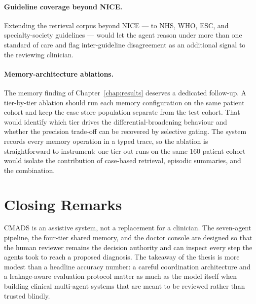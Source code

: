 \paragraph{Guideline coverage beyond NICE.}
Extending the retrieval corpus beyond NICE --- to NHS, WHO, ESC, and
specialty-society guidelines --- would let the agent reason under more
than one standard of care and flag inter-guideline disagreement as an
additional signal to the reviewing clinician.

\paragraph{Memory-architecture ablations.}
The memory finding of Chapter~\ref{chap:results} deserves a dedicated
follow-up. A tier-by-tier ablation should run each memory configuration on the
same patient cohort and keep the case store population separate from the test
cohort. That would identify which tier drives the differential-broadening
behaviour and whether the precision trade-off can be recovered by selective
gating. The system records every memory operation in a typed trace, so the
ablation is straightforward to instrument: one-tier-out runs on the same
160-patient cohort would isolate the contribution of case-based retrieval,
episodic summaries, and the combination.

\section{Closing Remarks}
\label{sec:concl_remarks}

CMADS is an assistive system, not a replacement for a clinician. The
seven-agent pipeline, the four-tier shared memory, and the doctor
console are designed so that the human reviewer remains the decision
authority and can inspect every step the agents took to reach a
proposed diagnosis. The takeaway of the thesis is more modest than a
headline accuracy number: a careful coordination architecture and a
leakage-aware evaluation protocol matter as much as the model itself
when building clinical multi-agent systems that are meant to be
reviewed rather than trusted blindly.
